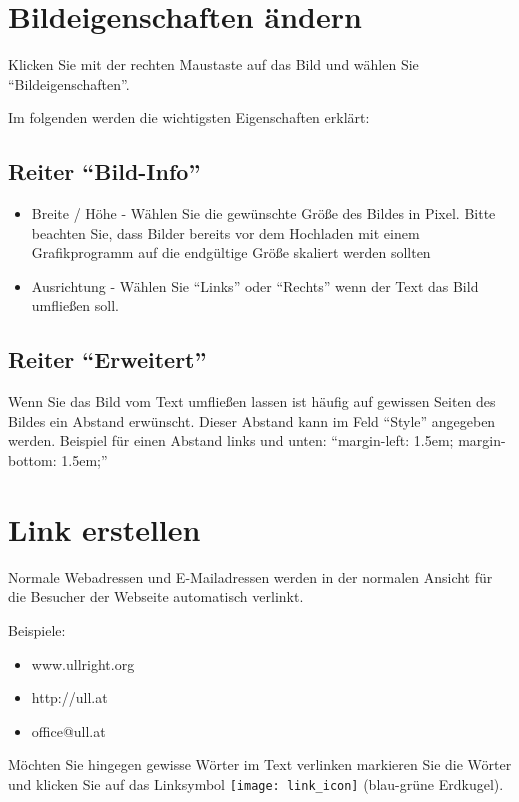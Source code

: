 \documentclass[article, a4paper, oneside, 11pt]{memoir}
\begin{document}
\section{Bildeigenschaften ändern}

Klicken Sie mit der rechten Maustaste auf das Bild und wählen Sie "`Bildeigenschaften"'.

Im folgenden werden die wichtigsten Eigenschaften erklärt:

\subsection{Reiter "`Bild-Info"'}

\begin{itemize}
\item Breite / Höhe - Wählen Sie die gewünschte Größe des Bildes in Pixel. Bitte beachten Sie, dass Bilder bereits vor dem Hochladen mit einem Grafikprogramm auf die endgültige Größe skaliert werden sollten
\item Ausrichtung - Wählen Sie "`Links"' oder "`Rechts"' wenn der Text das Bild umfließen soll.
\end{itemize}

\subsection{Reiter "`Erweitert"'}

Wenn Sie das Bild vom Text umfließen lassen ist häufig auf gewissen Seiten des Bildes ein Abstand erwünscht.
Dieser Abstand kann im Feld "`Style"' angegeben werden. Beispiel für einen Abstand links und unten: "`margin-left: 1.5em; margin-bottom: 1.5em;"'


\section{Link erstellen}

Normale Webadressen und E-Mailadressen werden in der normalen Ansicht für die Besucher der Webseite automatisch verlinkt.

Beispiele:

\begin{itemize}
\item www.ullright.org
\item http://ull.at
\item office@ull.at
\end{itemize}

Möchten Sie hingegen gewisse Wörter im Text verlinken markieren Sie die Wörter und klicken Sie auf das Linksymbol \texttt{[image: link\_icon]} (blau-grüne Erdkugel).
\end{document}
